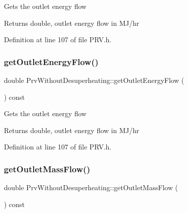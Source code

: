 Gets the outlet energy flow \begin{DoxyReturn}{Returns}
double, outlet energy flow in M\+J/hr 
\end{DoxyReturn}


Definition at line 107 of file P\+R\+V.\+h.

\mbox{\label{class_prv_without_desuperheating_ab13245e86b90832de0b4190163236551}} 
\subsubsection{\texorpdfstring{get\+Outlet\+Energy\+Flow()}{getOutletEnergyFlow()}\hspace{0.1cm}{\footnotesize\ttfamily [3/3]}}
{\footnotesize\ttfamily double Prv\+Without\+Desuperheating\+::get\+Outlet\+Energy\+Flow (\begin{DoxyParamCaption}{ }\end{DoxyParamCaption}) const\hspace{0.3cm}{\ttfamily [inline]}}

Gets the outlet energy flow \begin{DoxyReturn}{Returns}
double, outlet energy flow in M\+J/hr 
\end{DoxyReturn}


Definition at line 107 of file P\+R\+V.\+h.

\mbox{\label{class_prv_without_desuperheating_a12c0bf1f0c29e56e6e07ece3fe865c1b}} 
\subsubsection{\texorpdfstring{get\+Outlet\+Mass\+Flow()}{getOutletMassFlow()}\hspace{0.1cm}{\footnotesize\ttfamily [1/3]}}
{\footnotesize\ttfamily double Prv\+Without\+Desuperheating\+::get\+Outlet\+Mass\+Flow (\begin{DoxyParamCaption}{ }\end{DoxyParamCaption}) const\hspace{0.3cm}{\ttfamily [inline]}}

